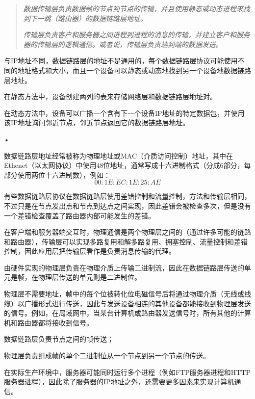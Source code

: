 \begin{quote}
\textsl{数据传输层负责数据帧的节点到节点的传输，并且使用静态或动态进程来找到下一跳（路由器）的数据链路层地址。}

\textsl{传输层负责客户和服务器之间进程到进程的消息的传输，并建立客户和服务器的传输层的逻辑通信。或者说，传输层负责端到端的数据发送。}
\end{quote}


与IP地址不同，数据链路层的地址不是通用的，每个数据链路层协议可能使用不同的地址格式和大小，而且一个设备可以静态或动态地找到另一个设备地数据链路层地址。

\begin{compactitem}
\item 在静态方法中，设备创建两列的表来存储网络层和数据链路层地址对。
\item 在动态方法中，设备可以广播一个含有下一个设备IP地址的特定数据包，并使用该IP地址询问邻近节点，邻近节点返回它的数据链路层地址。
\end{compactitem}•

数据链路层地址经常被称为物理地址或MAC（介质访问控制）地址，其中在Ethenet（以太网协议）中使用48位地址，通常写成十六进制格式（分成6部分，每部分使用两位十六进制数），例如：
\[00:1E:EC:1E:25:AE\]

有些数据链路层协议在数据链路层使用差错控制和流量控制，方法和传输层相同，不过只是在节点发出点和节点到达点之间实现，因此差错会被检查多次，但是没有一个差错检查覆盖了路由器内部可能发生的差错。

在客户端和服务器端交互时，物理通信是两个物理层之间的（通过许多可能的链路和路由器），传输层可以实现多路复用和解多路复用、拥塞控制、流量控制和差错控制，因此应用层把传输层看作是负责消息传输的代理。

由硬件实现的物理层负责在物理介质上传输二进制流，因此在数据链路层传送的单元是帧，在物理层传送的单元则是二进制位。

物理层不需要地址，帧中的每个位被转化位电磁信号后将通过物理介质（无线或线缆）以广播形式进行传送，因此与发送设备相连的其他设备都能接收到物理层发送的信号。例如，在局域网中，当某台计算机或路由器发送信号时，所有其他的计算机和路由器都将接收到信号。

\begin{compactitem}
\item 数据链路层负责节点之间的帧传送；
\item 物理层负责组成帧的单个二进制位从一个节点到另一个节点的传送。
\end{compactitem}



在实际生产环境中，服务器可能同时运行多个进程（例如FTP服务器进程和HTTP服务器进程），因此除了服务器的IP地址之外，还需要更多因素来实现计算机通信。

